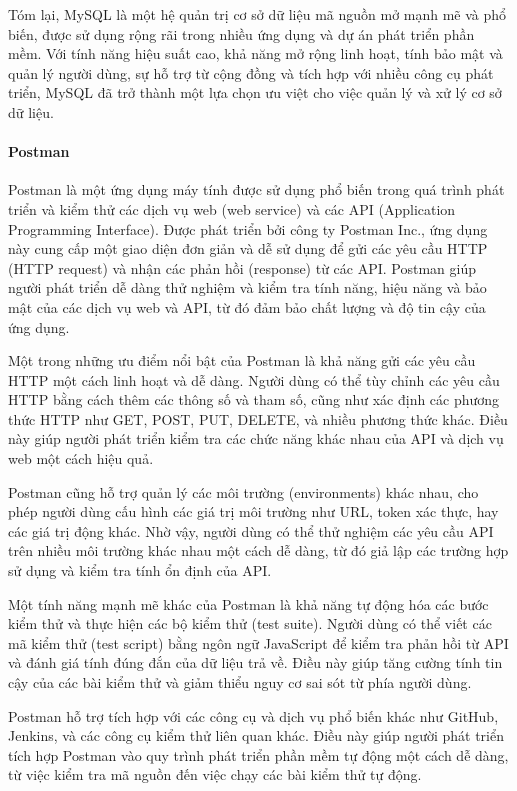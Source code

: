 Tóm lại, MySQL là một hệ quản trị cơ sở dữ liệu mã nguồn mở mạnh mẽ và phổ biến, được sử dụng rộng rãi trong nhiều ứng dụng và dự án phát triển phần mềm. Với tính năng hiệu suất cao, khả năng mở rộng linh hoạt, tính bảo mật và quản lý người dùng, sự hỗ trợ từ cộng đồng và tích hợp với nhiều công cụ phát triển, MySQL đã trở thành một lựa chọn ưu việt cho việc quản lý và xử lý cơ sở dữ liệu.


\paragraph{Postman}
\mbox{}

Postman là một ứng dụng máy tính được sử dụng phổ biến trong quá trình phát triển và kiểm thử các dịch vụ web (web service) và các API (Application Programming Interface). Được phát triển bởi công ty Postman Inc., ứng dụng này cung cấp một giao diện đơn giản và dễ sử dụng để gửi các yêu cầu HTTP (HTTP request) và nhận các phản hồi (response) từ các API. Postman giúp người phát triển dễ dàng thử nghiệm và kiểm tra tính năng, hiệu năng và bảo mật của các dịch vụ web và API, từ đó đảm bảo chất lượng và độ tin cậy của ứng dụng.

Một trong những ưu điểm nổi bật của Postman là khả năng gửi các yêu cầu HTTP một cách linh hoạt và dễ dàng. Người dùng có thể tùy chỉnh các yêu cầu HTTP bằng cách thêm các thông số và tham số, cũng như xác định các phương thức HTTP như GET, POST, PUT, DELETE, và nhiều phương thức khác. Điều này giúp người phát triển kiểm tra các chức năng khác nhau của API và dịch vụ web một cách hiệu quả.

Postman cũng hỗ trợ quản lý các môi trường (environments) khác nhau, cho phép người dùng cấu hình các giá trị môi trường như URL, token xác thực, hay các giá trị động khác. Nhờ vậy, người dùng có thể thử nghiệm các yêu cầu API trên nhiều môi trường khác nhau một cách dễ dàng, từ đó giả lập các trường hợp sử dụng và kiểm tra tính ổn định của API.

Một tính năng mạnh mẽ khác của Postman là khả năng tự động hóa các bước kiểm thử và thực hiện các bộ kiểm thử (test suite). Người dùng có thể viết các mã kiểm thử (test script) bằng ngôn ngữ JavaScript để kiểm tra phản hồi từ API và đánh giá tính đúng đắn của dữ liệu trả về. Điều này giúp tăng cường tính tin cậy của các bài kiểm thử và giảm thiểu nguy cơ sai sót từ phía người dùng.

Postman hỗ trợ tích hợp với các công cụ và dịch vụ phổ biến khác như GitHub, Jenkins, và các công cụ kiểm thử liên quan khác. Điều này giúp người phát triển tích hợp Postman vào quy trình phát triển phần mềm tự động một cách dễ dàng, từ việc kiểm tra mã nguồn đến việc chạy các bài kiểm thử tự động.

